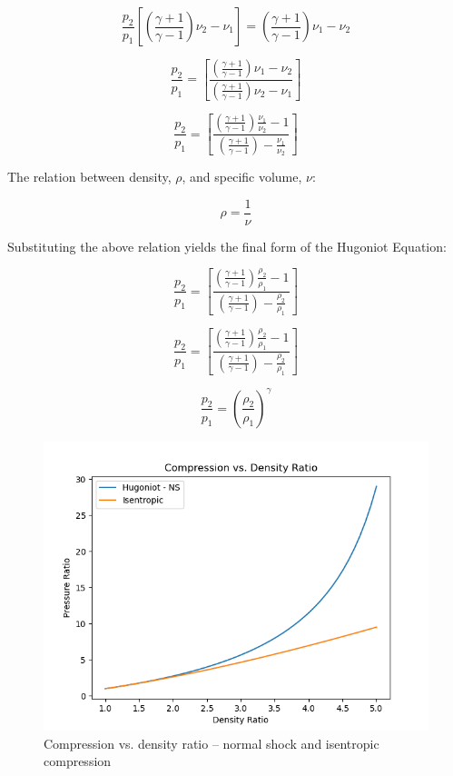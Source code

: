 \documentclass[../main.tex]{subfiles}
\begin{document}
\[
    \frac{p_2}{p_1} \left[{\left({\frac{\gamma+1}{\gamma-1}}\right) \nu_2 - \nu_1 }\right] =
    \left({\frac{\gamma+1}{\gamma-1}}\right) \nu_1 - \nu_2
\]

\[
    \frac{p_2}{p_1} = \left[{
        \frac{\left({\frac{\gamma+1}{\gamma-1}}\right) \nu_1 - \nu_2}{{\left({\frac{\gamma+1}{\gamma-1}}\right) \nu_2 - \nu_1 }}
    }\right]
\]

\[
    \frac{p_2}{p_1} = \left[{
        \frac{\left({\frac{\gamma+1}{\gamma-1}}\right) \frac{\nu_1}{\nu_2} - 1}{{\left({\frac{\gamma+1}{\gamma-1}}\right) - \frac{\nu_1}{\nu_2} }}
    }\right]
\]

The relation between density, \(\rho\), and specific volume, \(\nu\):

\[
    \rho = \frac{1}{\nu}
\]

Substituting the above relation yields the final form of the Hugoniot Equation:

\[
    \boxed{
    \frac{p_2}{p_1} = \left[{
        \frac{\left({\frac{\gamma+1}{\gamma-1}}\right) \frac{\rho_2}{\rho_1} - 1}{{\left({\frac{\gamma+1}{\gamma-1}}\right) - \frac{\rho_2}{\rho_1} }}
    }\right]
    }
\]

\discussion{}


\solution{}

\[
    \frac{p_2}{p_1} = \left[{
        \frac{\left({\frac{\gamma+1}{\gamma-1}}\right) \frac{\rho_2}{\rho_1} - 1}{{\left({\frac{\gamma+1}{\gamma-1}}\right) - \frac{\rho_2}{\rho_1} }}
    }\right]
\]

\[
    \frac{p_2}{p_1} = \left({\frac{\rho_2}{\rho_1}}\right)^\gamma
\]

\begin{figure}[h]
    \centering
    \includegraphics{../../images/problem_1/hugoniot_vs_isentropic_compression.png}
    \caption{Compression vs. density ratio -- normal shock and isentropic compression}
\end{figure}
\end{document}
